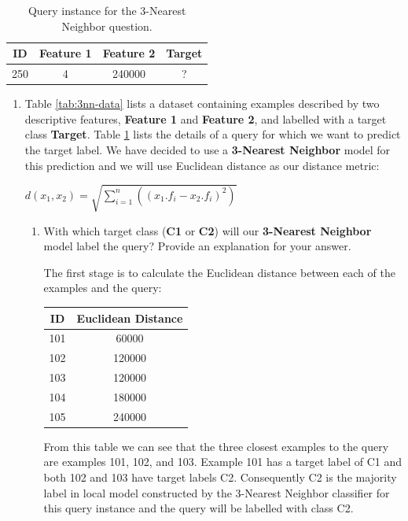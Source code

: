 \documentclass[solution]{ditpaper}
\begin{document}
\begin{table}[htdp]
\caption{Query instance for the 3-Nearest Neighbor question.}
\begin{center}
\begin{tabular}{|c|c|c|c|}
\hline
ID & Feature 1 & Feature 2  & Target \\
\hline
250 & 4 &	240000 & ?\\
\hline
\end{tabular}
\end{center}
\label{tab:3nn-query}
\end{table}%
			
\question 
	\begin{enumerate}	
		\item Table \ref{tab:3nn-data} lists a dataset containing examples described by two descriptive features, \textbf{Feature 1} and \textbf{Feature 2}, and labelled with a target class \textbf{Target}. Table \ref{tab:3nn-query} lists the details of a query for which we want to predict the target label. We have decided to use a \textbf{3-Nearest Neighbor} model for this prediction and we will use Euclidean distance as our distance metric: 
								\begin{center}
								$d(x_1,x_2)=\sqrt{\sum_{i=1}^{n} \left(\left(x_1.f_i - x_2.f_i \right)^2 \right)}$
								\end{center}					
		\begin{enumerate}
				\item With which target class (\textbf{C1}  or \textbf{C2}) will our \textbf{3-Nearest Neighbor} model label the query? Provide an explanation for your answer.				
				\begin{answer}
					The first stage is to calculate the Euclidean distance between each of the examples and the query:
					\begin{center}
						\begin{tabular}{|c|c|}
						ID & Euclidean Distance \\
						\hline
						101 & 60000\\
						102 & 120000\\
						103 & 120000\\
						104 & 180000\\
						105 & 240000\\
						\hline
						\end{tabular}
					\end{center}
				 From this table we can see that the three closest examples to the query are examples 101, 102, and 103. Example 101 has a target label of C1 and both 102 and 103 have target labels C2. Consequently C2 is the majority label in local model constructed by the 3-Nearest Neighbor classifier for this query instance and the query will be labelled with class C2.

\end{answer}
\end{enumerate}
\end{enumerate}
\end{document}
